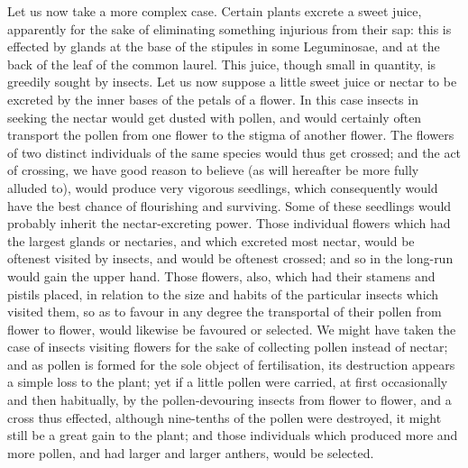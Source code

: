 Let us now take a more complex case. Certain plants excrete a sweet juice, apparently for the sake of eliminating something injurious from their sap: this is effected by glands at the base of the stipules in some Leguminosae, and at the back of the leaf of the common laurel. This juice, though small in quantity, is greedily sought by insects. Let us now suppose a little sweet juice or nectar to be excreted by the inner bases of the petals of a flower. In this case insects in seeking the nectar would get dusted with pollen, and would certainly often transport the pollen from one flower to the stigma of another flower. The flowers of two distinct individuals of the same species would thus get crossed; and the act of crossing, we have good reason to believe (as will hereafter be more fully alluded to), would produce very vigorous seedlings, which consequently would have the best chance of flourishing and surviving. Some of these seedlings would probably inherit the nectar-excreting power. Those individual flowers which had the largest glands or nectaries, and which excreted most nectar, would be oftenest visited by insects, and would be oftenest crossed; and so in the long-run would gain the upper hand. Those flowers, also, which had their stamens and pistils placed, in relation to the size and habits of the particular insects which visited them, so as to favour in any degree the transportal of their pollen from flower to flower, would likewise be favoured or selected. We might have taken the case of insects visiting flowers for the sake of collecting pollen instead of nectar; and as pollen is formed for the sole object of fertilisation, its destruction appears a simple loss to the plant; yet if a little pollen were carried, at first occasionally and then habitually, by the pollen-devouring insects from flower to flower, and a cross thus effected, although nine-tenths of the pollen were destroyed, it might still be a great gain to the plant; and those individuals which produced more and more pollen, and had larger and larger anthers, would be selected.
